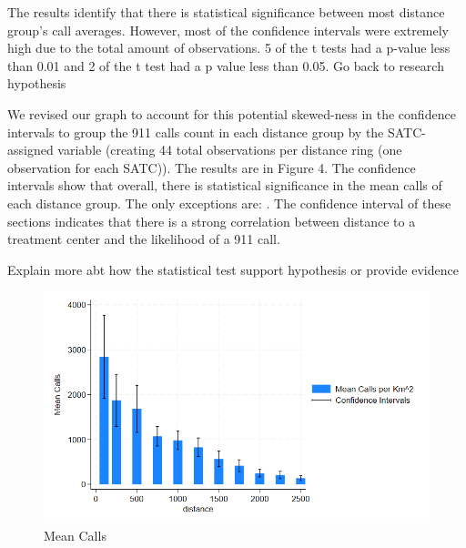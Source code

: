 \documentclass[12pt]{article}
\begin{document}
The results identify that there is statistical significance between most distance group's call averages. However, most of the confidence intervals were extremely high due to the total amount of observations. 5 of the t tests had a p-value less than 0.01 and 2 of the t test had a p value less than 0.05.  Go back to research hypothesis 

We revised our graph to account for this potential skewed-ness in the confidence intervals to group the 911 calls count in each distance group by the SATC-assigned variable (creating 44 total observations per distance ring (one observation for each SATC)). The results are in Figure 4. The confidence intervals show that overall, there is statistical significance in the mean calls of each distance group. The only exceptions are: . The confidence interval of these sections indicates that there is a strong correlation between distance to a treatment center and the likelihood of a 911 call.

 Explain more abt how the statistical test support hypothesis or provide evidence

\begin{figure}[ht]
    \centering
    \includegraphics[width=1\linewidth]{Reproducibility Package//Visual Graphics/CI_Graph.png}
    \caption{Mean Calls}
    \label{fig:enter-label}
\end{figure}
\end{document}
